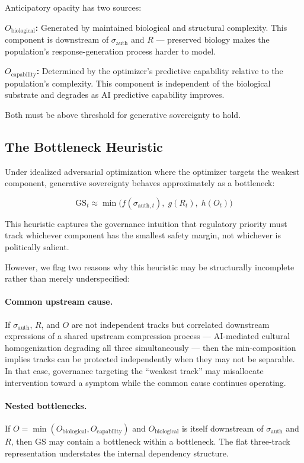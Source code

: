 \documentclass[11pt, a4paper]{article}
\theoremstyle{remark}
\begin{document}
Anticipatory opacity has two sources:

\textbf{$O_{\text{biological}}$:} Generated by maintained biological and structural complexity. This component is downstream of $\sigma_{\text{auth}}$ and $R$ --- preserved biology makes the population's response-generation process harder to model.

\textbf{$O_{\text{capability}}$:} Determined by the optimizer's predictive capability relative to the population's complexity. This component is independent of the biological substrate and degrades as AI predictive capability improves.

Both must be above threshold for generative sovereignty to hold.

\subsection{The Bottleneck Heuristic}\label{sec:bottleneck}

Under idealized adversarial optimization where the optimizer targets the weakest component, generative sovereignty behaves approximately as a bottleneck:

\begin{equation}
\text{GS}_t \approx \min\bigl(f(\sigma_{\text{auth},t}),\; g(R_t),\; h(O_t)\bigr)
\label{eq:bottleneck}
\end{equation}

This heuristic captures the governance intuition that regulatory priority must track whichever component has the smallest safety margin, not whichever is politically salient.

However, we flag two reasons why this heuristic may be structurally incomplete rather than merely underspecified:

\paragraph{Common upstream cause.} If $\sigma_{\text{auth}}$, $R$, and $O$ are not independent tracks but correlated downstream expressions of a shared upstream compression process --- AI-mediated cultural homogenization degrading all three simultaneously --- then the min-composition implies tracks can be protected independently when they may not be separable. In that case, governance targeting the ``weakest track'' may misallocate intervention toward a symptom while the common cause continues operating.

\paragraph{Nested bottlenecks.} If $O = \min(O_{\text{biological}}, O_{\text{capability}})$ and $O_{\text{biological}}$ is itself downstream of $\sigma_{\text{auth}}$ and $R$, then GS may contain a bottleneck within a bottleneck. The flat three-track representation understates the internal dependency structure.
\end{document}
